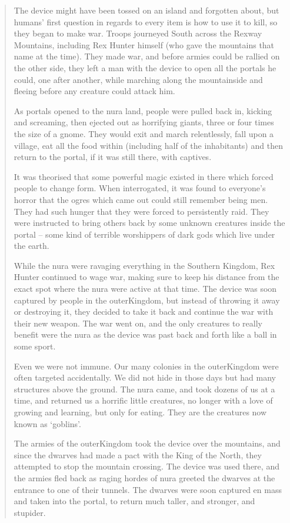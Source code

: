 \begin{multicols}{2}
\begin{quotation}
  The device might have been tossed on an island and forgotten about, but humans' first question in regards to every item is how to use it to kill, so they began to make war.
  Troops journeyed South across the Rexway Mountains, including Rex Hunter himself (who gave the mountains that name at the time).
  They made war, and before armies could be rallied on the other side, they left a man with the device to open all the portals he could, one after another, while marching along the mountainside and fleeing before any creature could attack him.

  As portals opened to the nura land, people were pulled back in, kicking and screaming, then ejected out as horrifying giants, three or four times the size of a gnome.
  They would exit and march relentlessly, fall upon a village, eat all the food within (including half of the inhabitants) and then return to the portal, if it was still there, with captives.

  It was theorised that some powerful magic existed in there which forced people to change form.
  When interrogated, it was found to everyone's horror that the ogres which came out could still remember being men.
  They had such hunger that they were forced to persistently raid.
  They were instructed to bring others back by some unknown creatures inside the portal -- some kind of terrible worshippers of dark gods which live under the earth.

  While the nura were ravaging everything in the Southern Kingdom, Rex Hunter continued to wage war, making sure to keep his distance from the exact spot where the nura were active at that time.
  The device was soon captured by people in the \gls{outerKingdom}, but instead of throwing it away or destroying it, they decided to take it back and continue the war with their new weapon.
  The war went on, and the only creatures to really benefit were the nura as the device was past back and forth like a ball in some sport.

  Even we were not immune.
  Our many colonies in the \gls{outerKingdom} were often targeted accidentally.
  We did not hide in those days but had many structures above the ground.
  The nura came, and took dozens of us at a time, and returned us a horrific little creatures, no longer with a love of growing and learning, but only for eating.
  They are the creatures now known as `goblins'.

  The armies of the \gls{outerKingdom} took the device over the mountains, and since the dwarves had made a pact with the King of the North, they attempted to stop the mountain crossing.
  The device was used there, and the armies fled back as raging hordes of nura greeted the dwarves at the entrance to one of their tunnels.
  The dwarves were soon captured en mass and taken into the portal, to return much taller, and stronger, and stupider.


\end{quotation}
\end{multicols}
